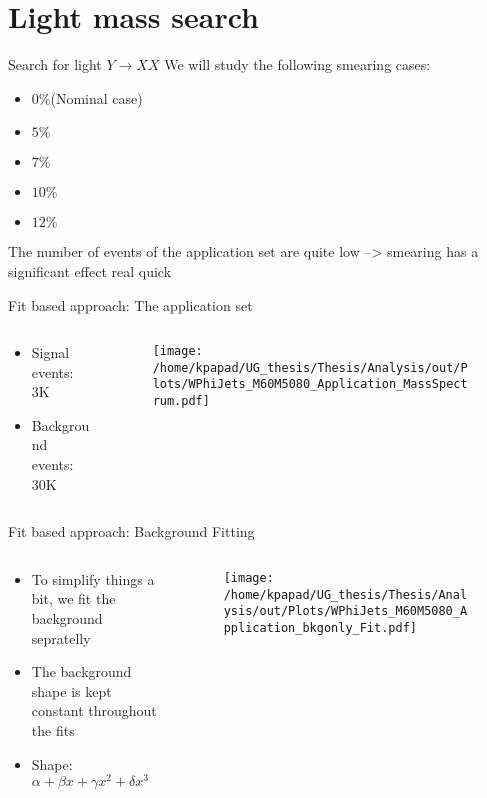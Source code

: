 \documentclass[bigger]{beamer}
\begin{document}
\section{Light mass search}
\label{sec:orgcb764b8}
\begin{frame}[label={sec:orgd9d9839}]{Search for light \(Y \rightarrow XX\)}
We will study the following smearing cases:
\begin{itemize}
\item \(0\%\)(Nominal case)
\item \(5\%\)
\item \(7\%\)
\item \(10\%\)
\item \(12\%\)
\end{itemize}
The number of events of the application set are quite low --> smearing has a significant effect real quick 
\end{frame}
\begin{frame}[label={sec:org298e900}]{Fit based approach: The application set}
\begin{columns}
\begin{column}{0.5\columnwidth}
\begin{itemize}
\item Signal events: 3K
\item Background events: 30K
\end{itemize}
\end{column}
\begin{column}{0.5\columnwidth}
\begin{figure}[h]
\centering
\texttt{[image: /home/kpapad/UG\_thesis/Thesis/Analysis/out/Plots/WPhiJets\_M60M5080\_Application\_MassSpectrum.pdf]}
\end{figure}
\end{column}
\end{columns}
\end{frame}
\begin{frame}[label={sec:orgd0dde85}]{Fit based approach: Background Fitting}
\begin{columns}
\begin{column}{0.5\columnwidth}
\begin{itemize}
\item To simplify things a bit, we fit the background sepratelly
\item The background shape is kept constant throughout the fits
\item Shape: \(\alpha + \beta x + \gamma x^2 + \delta x^3\)
\end{itemize}
\end{column}
\begin{column}{0.5\columnwidth}
\begin{figure}[h]
\centering
\texttt{[image: /home/kpapad/UG\_thesis/Thesis/Analysis/out/Plots/WPhiJets\_M60M5080\_Application\_bkgonly\_Fit.pdf]}
\end{figure}
\end{column}
\end{columns}
\end{frame}
\end{document}
